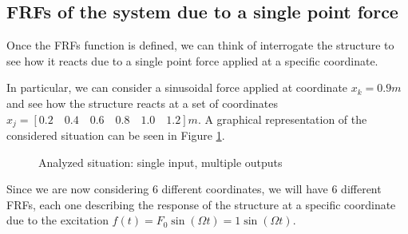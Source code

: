 \subsection{FRFs of the system due to a single point force}
\label{subsec:FRFs_of_the_system_due_to_a_single_point_force}

Once the FRFs function is defined, we can think of interrogate the structure to see how it reacts due to a single point force applied at a specific coordinate.

In particular, we can consider a sinusoidal force applied at coordinate $x_k = 0.9m$ and see how the structure reacts at a set of coordinates $x_j = [0.2 \quad 0.4 \quad 0.6 \quad 0.8 \quad 1.0 \quad 1.2]m$.
A graphical representation of the considered situation can be seen in Figure \ref{fig:beam_single_point_force}.

\begin{figure}[H]
    \centering
    \caption{Analyzed situation: single input, multiple outputs}
    \label{fig:beam_single_point_force}
\end{figure}

Since we are now considering $6$ different coordinates, we will have $6$ different FRFs, each one describing the response of the structure at a specific coordinate due to the excitation $f(t) = F_0 \sin(\Omega t) = 1 \sin(\Omega t)$.

